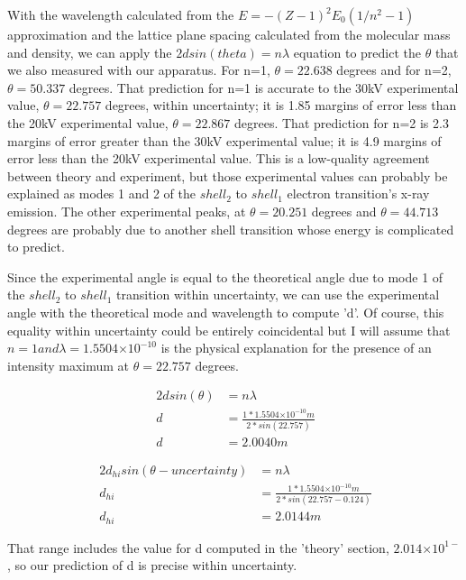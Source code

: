 \documentclass{article}
\providecommand{\e}[1]{\ensuremath{\times 10^{#1}}}
\begin{document}
With the wavelength calculated from the $E = -(Z-1)^2 E_0 (1/n^2 - 1)$ approximation and the lattice plane spacing calculated from the molecular mass and density, we can apply the $ 2d sin(theta) = n \lambda $ equation to predict the $\theta$ that we also measured with our apparatus. For n=1, $\theta = 22.638$ degrees and for n=2, $\theta = 50.337$ degrees. That prediction for n=1 is accurate to the 30kV experimental value, $\theta = 22.757$ degrees, within uncertainty; it is 1.85 margins of error less than the 20kV experimental value, $\theta =  22.867$ degrees. That prediction for n=2 is 2.3 margins of error greater than the 30kV experimental value; it is 4.9 margins of error less than the 20kV experimental value. This is a low-quality agreement between theory and experiment, but those experimental values can probably be explained as modes 1 and 2 of the $shell_2$ to $shell_1$ electron transition's x-ray emission. The other experimental peaks, at $\theta = 20.251$ degrees and $\theta = 44.713$ degrees are probably due to another shell transition whose energy is complicated to predict.

Since the experimental angle is equal to the theoretical angle due to mode 1 of the $shell_2$ to $shell_1$ transition within uncertainty, we can use the experimental angle with the theoretical mode and wavelength to compute 'd'. Of course, this equality within uncertainty could be entirely coincidental but I will assume that $n=1 and \lambda = 1.5504\e{-10}$ is the physical explanation for the presence of an intensity maximum at $\theta = 22.757$ degrees.

\begin{align*}
\ 2d sin(\theta) &= n \lambda \\
\ d &= \frac{1 * 1.5504\e{-10} m}{2 * sin(22.757)} \\
\ d &= 2.0040 m 
\end{align*}

\begin{align*}
\ 2 d_{hi} sin(\theta - uncertainty) &= n \lambda \\
\ d_{hi} &= \frac{1 * 1.5504\e{-10} m}{2 * sin(22.757 - 0.124)} \\
\ d_{hi} &= 2.0144 m 
\end{align*}

That range includes the value for d computed in the 'theory' section, $2.014\e{1-}$, so our prediction of d is precise within uncertainty. 
\end{document}
